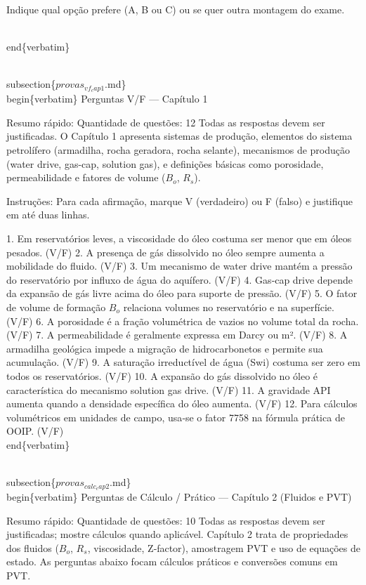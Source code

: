 \documentclass[11pt,a4paper]{article}
\begin{document}
\begin{enumerate}
{Indique qual opção prefere (A, B ou C) ou se quer outra montagem do exame.

\\end\{verbatim\}

\\subsection\{$provas_{vf_cap1}$.md\}
\\begin\{verbatim\}
Perguntas V/F — Capítulo 1

Resumo rápido:
Quantidade de questões: 12
Todas as respostas devem ser justificadas.
O Capítulo 1 apresenta sistemas de produção, elementos do sistema petrolífero (armadilha, rocha geradora, rocha selante), mecanismos de produção (water drive, gas-cap, solution gas), e definições básicas como porosidade, permeabilidade e fatores de volume ($B_{o}$, $R_{s}$).

Instruções: Para cada afirmação, marque V (verdadeiro) ou F (falso) e justifique em até duas linhas.

1. Em reservatórios leves, a viscosidade do óleo costuma ser menor que em óleos pesados. (V/F)
2. A presença de gás dissolvido no óleo sempre aumenta a mobilidade do fluido. (V/F)
3. Um mecanismo de water drive mantém a pressão do reservatório por influxo de água do aquífero. (V/F)
4. Gas‑cap drive depende da expansão de gás livre acima do óleo para suporte de pressão. (V/F)
5. O fator de volume de formação $B_o$ relaciona volumes no reservatório e na superfície. (V/F)
6. A porosidade é a fração volumétrica de vazios no volume total da rocha. (V/F)
7. A permeabilidade é geralmente expressa em Darcy ou m². (V/F)
8. A armadilha geológica impede a migração de hidrocarbonetos e permite sua acumulação. (V/F)
9. A saturação irreductível de água (Swi) costuma ser zero em todos os reservatórios. (V/F)
10. A expansão do gás dissolvido no óleo é característica do mecanismo solution gas drive. (V/F)
11. A gravidade API aumenta quando a densidade específica do óleo aumenta. (V/F)
12. Para cálculos volumétricos em unidades de campo, usa‑se o fator 7758 na fórmula prática de OOIP. (V/F)
\\end\{verbatim\}

\\subsection\{$provas_{calc_cap2}$.md\}
\\begin\{verbatim\}
Perguntas de Cálculo / Prático — Capítulo 2 (Fluidos e PVT)

Resumo rápido:
Quantidade de questões: 10
Todas as respostas devem ser justificadas; mostre cálculos quando aplicável.
Capítulo 2 trata de propriedades dos fluidos ($B_{o}$, $R_{s}$, viscosidade, Z‑factor), amostragem PVT e uso de equações de estado. As perguntas abaixo focam cálculos práticos e conversões comuns em PVT.

}
\end{enumerate}
\end{document}
